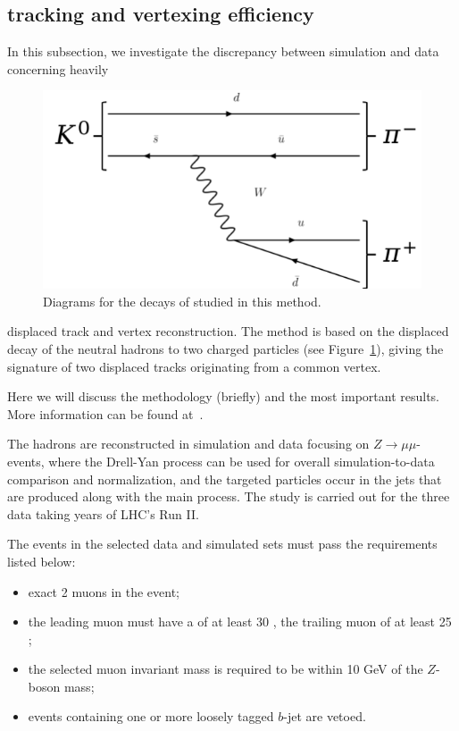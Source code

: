 \subsection{\Displ tracking and vertexing efficiency}
\label{sec:displacedvertex}

In this subsection, we investigate the discrepancy between simulation
and data concerning heavily
\begin{figure}
   \includegraphics[width=0.8\linewidth]{Figures/c6/efficiencies/diagram_ks}
   \caption{Diagrams for the decays of \PKzS studied in this method.}
    \label{fig:svdiagrams}
\end{figure}
 displaced track and vertex
reconstruction. 
The method is based on the displaced decay of the
neutral hadrons \PKzS to two charged particles (see
Figure~\ref{fig:svdiagrams}), giving the signature of two displaced tracks
originating from a common vertex.

 Here we will discuss the methodology
(briefly) and the most important results. More information can be found at~\cite{AN-20-111_KshortStudy}.

The \PKzS hadrons are reconstructed in simulation and data focusing on $Z\rightarrow \mu\mu$-events, where the Drell-Yan process can be used for overall simulation-to-data comparison and normalization, and the targeted particles occur in the jets that are produced along with the main process. The study is carried out for the three data taking years of LHC's Run II.

\noindent The events in the selected data and simulated sets must pass the requirements listed below:
\begin{itemize}
\setlength\itemsep{-0.2em}
    \item exact 2 muons in the event;
    \item the leading muon must have a \pt of at least 30 \GeV, the trailing muon of at least 25 \GeV;
    \item the selected muon invariant mass is required to be within 10 GeV of the $Z$-boson mass;
    \item events containing one or more loosely tagged $b$-jet are vetoed.
\end{itemize}

